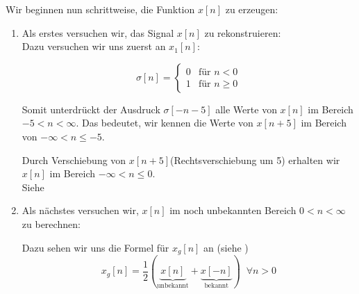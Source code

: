 \begin{uebsp}
\begin{Exercise}
        \begin{center}
            \def\label{\formulaOne}
        \end{center}
    \end{Exercise}
    \begin{Answer}
        Wir beginnen nun schrittweise, die Funktion $x[n]$ zu erzeugen:
        \begin{enumerate}
            \item Als erstes versuchen wir, das Signal $x[n]$ zu rekonstruieren:\\
                Dazu versuchen wir uns zuerst an $x_1[n]$:
                \begin{definition}
                    \[\sigma[n]=\begin{cases}0 & \text{für }n<0\\1& \text{für }n\geq 0\end{cases}\]
                \end{definition}
                Somit unterdrückt der Ausdruck $\sigma[-n-5]$ alle Werte von $x[n]$ im Bereich $-5<n<\infty$.
                Das bedeutet, wir kennen die Werte von $x[n+5]$ im Bereich von $-\infty<n\leq -5$.

                Durch Verschiebung von $x[n+5]$(Rechtsverschiebung um 5) erhalten wir $x[n]$ im Bereich $-\infty<n\leq 0$.\\
                Siehe 
            \item Als nächstes versuchen wir, $x[n]$ im noch unbekannten Bereich $0<n<\infty$ zu berechnen:
                \begin{uebsp_theory}
                    Dazu sehen wir uns die Formel für $x_g[n]$ an (siehe )
                    \[x_g[n]=\frac{1}{2}(\underbrace{x[n]}_{\text{unbekannt}}+\underbrace{x[-n]}_{\text{bekannt}})\;\;\forall n>0\]
                \end{uebsp_theory}


\end{enumerate}
\end{Answer}
\end{uebsp}
